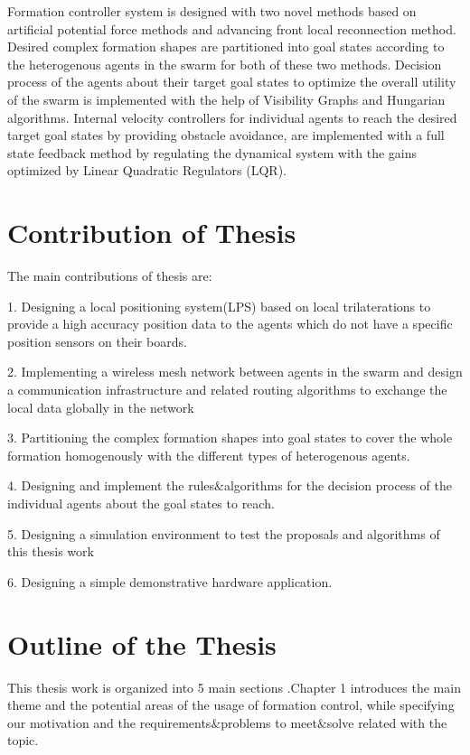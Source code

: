 Formation controller system is designed with two novel methods based on artificial potential force methods and advancing front local reconnection method. Desired complex formation shapes are partitioned into goal states according to the heterogenous agents in the swarm for both of these two methods. Decision process of the agents about their target goal states to optimize the overall utility of the swarm is implemented with the help of Visibility Graphs and Hungarian algorithms. Internal velocity controllers for individual agents to reach the desired target goal states by providing obstacle avoidance, are implemented with a full state feedback method by regulating the dynamical system with the gains optimized by Linear Quadratic Regulators (LQR).


\section{Contribution of Thesis}

The main contributions of thesis are:

1. Designing a local positioning system(LPS) based on local trilaterations to provide a high accuracy position data to the agents which do not have a specific position sensors on their boards.

2. Implementing a wireless mesh network between agents in the swarm and design a communication infrastructure and related routing algorithms to exchange the local data globally in the network

3. Partitioning the complex formation shapes into goal states to cover the whole formation homogenously with the different types of heterogenous agents.

4. Designing and implement the rules$\&$algorithms for the decision process of the individual agents about the goal states to reach.

5. Designing a simulation environment to test the proposals and algorithms of this thesis work

6. Designing a simple demonstrative hardware application.


\section{Outline of the Thesis}
This thesis work is organized into 5 main sections .Chapter 1 introduces the main theme and the potential areas of the usage of formation control, while specifying our motivation and the requirements$\&$problems to meet$\&$solve related with the topic.


